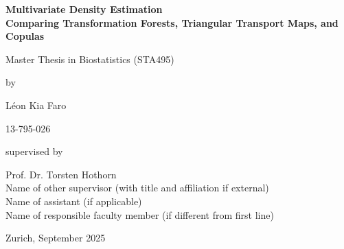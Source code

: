 \begin{titlepage}
\thispagestyle{empty}
\renewcommand\familydefault{\sfdefault}
\renewcommand{\baselinestretch}{1.5}\normalfont
\begin{center}
  \setlength{\parindent}{0cm}
  {\bfseries\Large
  Multivariate Density Estimation\\
  Comparing Transformation Forests, Triangular Transport Maps, and Copulas\par}

  \vspace{2mm}
  \hrulefill

  \vspace*{4cm}

  {\large Master Thesis in Biostatistics (STA495)\par}

  \vspace*{12mm}
  by

  \vspace*{12mm}
  Léon Kia Faro \\
  {\small 13-795-026\par}

  \vspace*{4cm}
  supervised by

  \vspace*{12mm}
  Prof. Dr. Torsten Hothorn\\
  Name of other supervisor (with title and affiliation if external)\\
  Name of assistant (if applicable)\\
  Name of responsible faculty member (if different from first line)

  \vfill
  Zurich, September 2025 
\end{center}
\renewcommand\familydefault{\rmdefault}
\renewcommand{\baselinestretch}{1.0}\rmfamily
\setcounter{page}{0}
\end{titlepage}
\restoregeometry
\cleardoublepage
